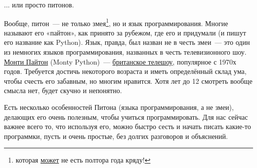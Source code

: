 ... или просто питонов.

Вообще, питон — не только змея\footnote{которая \href{https://ru.wikipedia.org/w/index.php?title=\%D0\%9F\%D0\%B8\%D1\%82\%D0\%BE\%D0\%BD\%D1\%8B&oldid=70828612\#.D0.9F.D0.B8.D1.82.D0.B0.D0.BD.D0.B8.D0.B5}{может} не есть полтора года кряду!}, но и язык программирования. Многие называют его «пайтон», как принято за рубежом, где его и придумали (и пишут его название как Python). Язык, правда, был назван не в честь змеи — это один из немногих языков программирования, названных в честь телевизионного шоу. \href{http://www.youtube.com/watch?v=YO2xZbac7lw&list=PL89E217812DCA2BDA}{Монти Пайтон} (Monty Python) — \href{http://www.montypython.com/}{британское телешоу}, популярное с 1970х годов. Требуется достичь некоторого возраста и иметь определённый склад ума, чтобы счесть его забавным, но многим нравится. Хотя лет до 12 смотреть вообще смысла нет, будет скучно и непонятно.

Есть несколько особенностей Питона (языка программирования, а не змеи), делающих его очень полезным, чтобы учиться программировать. Для нас сейчас важнее всего то, что используя его, можно быстро сесть и начать писать какие-то программки, пусть и очень простые, без долгих разговоров и объяснений.

